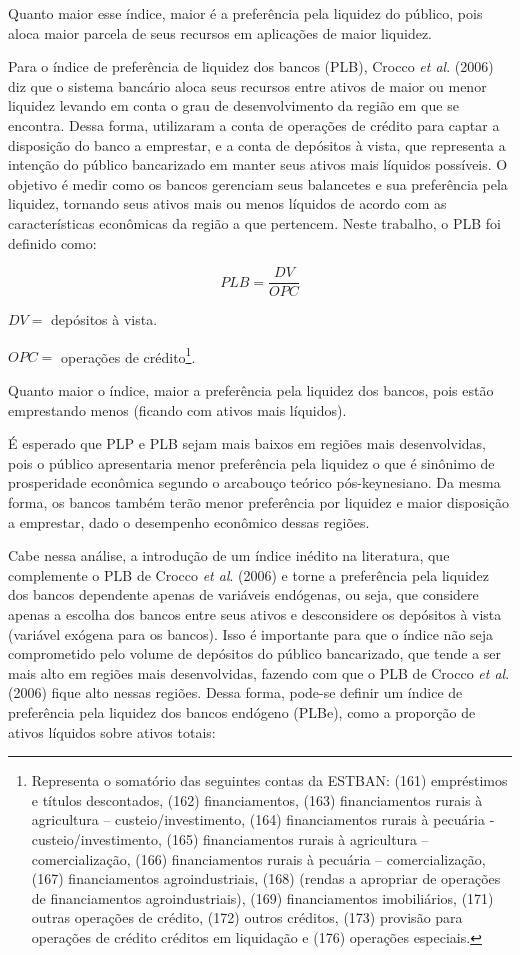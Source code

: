 \documentclass[a4paper,12pt]{article}
\begin{document}
Quanto maior esse índice, maior é a preferência pela liquidez do
público, pois aloca maior parcela de seus recursos em aplicações de
maior liquidez.

Para o índice de preferência de liquidez dos bancos (PLB), Crocco
\emph{et al}. (2006) diz que o sistema bancário aloca seus recursos
entre ativos de maior ou menor liquidez levando em conta o grau de
desenvolvimento da região em que se encontra. Dessa forma, utilizaram a
conta de operações de crédito para captar a disposição do banco a
emprestar, e a conta de depósitos à vista, que representa a intenção do
público bancarizado em manter seus ativos mais líquidos possíveis. O
objetivo é medir como os bancos gerenciam seus balancetes e sua
preferência pela liquidez, tornando seus ativos mais ou menos líquidos
de acordo com as características econômicas da região a que pertencem.
Neste trabalho, o PLB foi definido como:

\begin{equation}
PLB = \frac{DV}{OPC}
\end{equation}

\(DV =\) depósitos à vista.

\(OPC =\) operações de crédito\footnote{Representa o somatório das
  seguintes contas da ESTBAN: (161) empréstimos e títulos descontados,
  (162) financiamentos, (163) financiamentos rurais à agricultura --
  custeio/investimento, (164) financiamentos rurais à pecuária -
  custeio/investimento, (165) financiamentos rurais à agricultura --
  comercialização, (166) financiamentos rurais à pecuária --
  comercialização, (167) financiamentos agroindustriais, (168) (rendas a
  apropriar de operações de financiamentos agroindustriais), (169)
  financiamentos imobiliários, (171) outras operações de crédito, (172)
  outros créditos, (173) provisão para operações de crédito créditos em
  liquidação e (176) operações especiais.}.

Quanto maior o índice, maior a preferência pela liquidez dos bancos,
pois estão emprestando menos (ficando com ativos mais líquidos).

É esperado que PLP e PLB sejam mais baixos em regiões mais
desenvolvidas, pois o público apresentaria menor preferência pela
liquidez o que é sinônimo de prosperidade econômica segundo o arcabouço
teórico pós-keynesiano. Da mesma forma, os bancos também terão menor
preferência por liquidez e maior disposição a emprestar, dado o
desempenho econômico dessas regiões.

Cabe nessa análise, a introdução de um índice inédito na literatura, que
complemente o PLB de Crocco \emph{et al}. (2006) e torne a preferência
pela liquidez dos bancos dependente apenas de variáveis endógenas, ou
seja, que considere apenas a escolha dos bancos entre seus ativos e
desconsidere os depósitos à vista (variável exógena para os bancos).
Isso é importante para que o índice não seja comprometido pelo volume de
depósitos do público bancarizado, que tende a ser mais alto em regiões
mais desenvolvidas, fazendo com que o PLB de Crocco \emph{et al}. (2006)
fique alto nessas regiões. Dessa forma, pode-se definir um índice de
preferência pela liquidez dos bancos endógeno (PLBe), como a proporção
de ativos líquidos sobre ativos totais:
\end{document}
